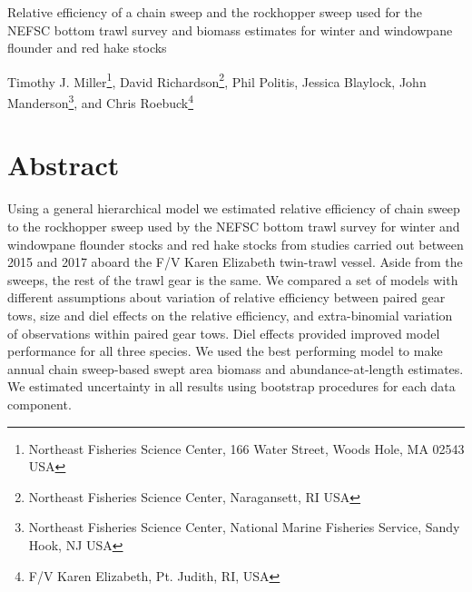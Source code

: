 \documentclass[12pt,letterpaper, leqno]{article}
\begin{document}


\pagestyle{plain}

\begin{titlepage}\center \large

\vspace{144pt}

Relative efficiency of a chain sweep and the rockhopper sweep used for the NEFSC bottom trawl survey and biomass estimates for winter and windowpane flounder and  red hake stocks

\vspace{144pt}

Timothy J. Miller\footnote{Northeast Fisheries Science Center, 166 Water Street, Woods Hole, MA 02543 USA}, David Richardson\footnote{Northeast Fisheries Science Center, Naragansett, RI USA}, Phil Politis\footnotemark[1], Jessica Blaylock\footnotemark[1], John Manderson\footnote{Northeast Fisheries Science Center, National Marine Fisheries Service, Sandy Hook, NJ USA}, and Chris Roebuck\footnote{F/V Karen Elizabeth, Pt. Judith, RI, USA}\\

\end{titlepage}

\setcounter{page}{2}

\cfoot{\thepage}

\setcounter{page}{2}
\def\fourteenbold{\fontseries{b}\fontsize{14pt}{12pt}\selectfont}
\def\twelvebold{\fontseries{b}\fontsize{12pt}{12pt}\selectfont}
\def\twelveit{\fontshape{it}\fontseries{m}\fontsize{12pt}{12pt}\selectfont}
\sectionfont{\fourteenbold}
\subsectionfont{\twelvebold}
\subsectionfont{\twelvebold}
\subsubsectionfont{\twelveit}

\section*{Abstract}

Using a general hierarchical model we estimated relative efficiency of chain sweep to the rockhopper sweep used by the NEFSC bottom trawl survey for winter and windowpane flounder stocks and red hake stocks from studies carried out between 2015 and 2017 aboard the F/V Karen Elizabeth twin-trawl vessel. Aside from the sweeps, the rest of the trawl gear is the same.  We compared a set of models with different assumptions about variation of relative efficiency between paired gear tows, size and diel effects on the relative efficiency, and extra-binomial variation of observations within paired gear tows.  Diel effects provided improved model performance for all three species. We used the best performing model to make annual chain sweep-based swept area biomass and abundance-at-length estimates. We estimated uncertainty in all results using bootstrap procedures for each data component. %
\end{document}
